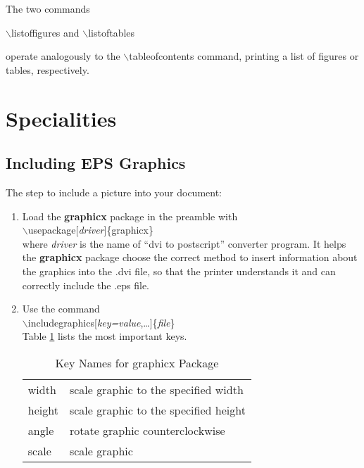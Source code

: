 \documentclass[11pt,a4paper]{article}
\begin{document}
The two commands
\begin{flushleft}
    $\backslash$listoffigures and $\backslash$listoftables
\end{flushleft}
operate analogously to the $\backslash$tableofcontents command, printing a list of 
figures or tables, respectively.
\section{Specialities}
\subsection{Including EPS Graphics}
The step to include a picture into your document:\\
\begin{enumerate}
    \item Load the \textbf{graphicx} package in the preamble with\\
        $\backslash$usepackage[\textit{driver}]\{graphicx\}\\
        where \textit{driver} is the name of ``dvi to postscript'' converter program.
        It helps the \textbf{graphicx} package choose the correct method to insert 
        information about the graphics into the .dvi file, so that the printer
        understands it and can correctly include the .eps file.
    \item Use the command\\
        $\backslash$includegraphics[\textit{key=value},\ldots]\{\textit{file}\}\\
        Table \ref{t2} lists the most important keys.\\
        \begin{table}[!h]
            \begin{center}
                \caption{Key Names for \textsf{graphicx} Package}\label{t2}
                \begin{tabular}{l l}
                    \hline
                    width  & scale graphic to the specified width\\
                    height & scale graphic to the specified height\\
                    angle  & rotate graphic counterclockwise\\
                    scale  & scale graphic\\
                    \hline
                \end{tabular}
            \end{center}
        \end{table}
\end{enumerate}
\end{document}
